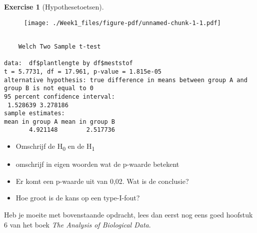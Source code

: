 \documentclass[
  letterpaper,
  DIV=11,
  numbers=noendperiod]{scrreprt}
\newenvironment{Shaded}{\begin{snugshade}}{\end{snugshade}}
\newcommand{\FunctionTok}[1]{\textcolor[rgb]{0.28,0.35,0.67}{#1}}
\newcommand{\NormalTok}[1]{\textcolor[rgb]{0.00,0.23,0.31}{#1}}
\newcommand{\SpecialCharTok}[1]{\textcolor[rgb]{0.37,0.37,0.37}{#1}}
\providecommand{\tightlist}{%
  \setlength{\itemsep}{0pt}\setlength{\parskip}{0pt}}\usepackage{longtable,booktabs,array}
\theoremstyle{definition}
\newtheorem{exercise}{Exercise}[chapter]
\theoremstyle{remark}
\begin{document}
\begin{exercise}[Hypothesetoetsen]
\begin{figure}[H]

{\centering \texttt{[image: ./Week1\_files/figure-pdf/unnamed-chunk-1-1.pdf]}

}

\end{figure}

\begin{Shaded}
\end{Shaded}

\begin{verbatim}

    Welch Two Sample t-test

data:  df$plantlengte by df$meststof
t = 5.7731, df = 17.961, p-value = 1.815e-05
alternative hypothesis: true difference in means between group A and group B is not equal to 0
95 percent confidence interval:
 1.528639 3.278186
sample estimates:
mean in group A mean in group B 
       4.921148        2.517736 
\end{verbatim}

\begin{itemize}
\tightlist
\item
  Omschrijf de H\textsubscript{0} en de H\textsubscript{1}
\item
  omschrijf in eigen woorden wat de p-waarde betekent
\item
  Er komt een p-waarde uit van 0,02. Wat is de conclusie?
\item
  Hoe groot is de kans op een type-I-fout?
\end{itemize}

\end{exercise}

\begin{tcolorbox}[enhanced jigsaw, colbacktitle=quarto-callout-color!10!white, colframe=quarto-callout-color-frame, leftrule=.75mm, title={Warning}, coltitle=black, toprule=.15mm, colback=white, breakable, opacityback=0, bottomrule=.15mm, arc=.35mm, opacitybacktitle=0.6, bottomtitle=1mm, toptitle=1mm, rightrule=.15mm, titlerule=0mm, left=2mm]
Heb je moeite met bovenstaande opdracht, lees dan eerst nog eens goed
hoofstuk 6 van het boek \emph{The Analysis of Biological Data}.
\end{tcolorbox}
\end{document}
